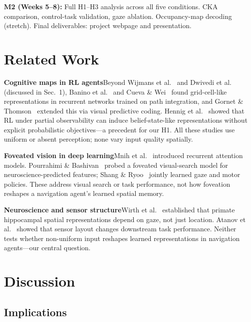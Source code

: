 \documentclass[10pt,conference,compsocconf]{IEEEtran}
\begin{document}
\noindent\textbf{M2 (Weeks 5--8):} Full H1--H3 analysis across all five conditions. CKA comparison, control-task validation, gaze ablation. Occupancy-map decoding (stretch). Final deliverables: project webpage and presentation.

\section{Related Work}

\textbf{Cognitive maps in RL agents}\quad Beyond Wijmans et al.~\cite{wijmans2023emergence} and Dwivedi et al.~\cite{dwivedi2022isee} (discussed in Sec.~1), Banino et al.~\cite{banino2018grid} and Cueva \& Wei~\cite{cueva2018grid} found grid-cell-like representations in recurrent networks trained on path integration, and Gornet \& Thomson~\cite{gornet2024cognitive} extended this via visual predictive coding. Hennig et al.~\cite{hennig2023belief} showed that RL under partial observability can induce belief-state-like representations without explicit probabilistic objectives---a precedent for our H1. All these studies use uniform or absent perception; none vary input quality spatially.

\textbf{Foveated vision in deep learning}\quad Mnih et al.~\cite{mnih2014attention} introduced recurrent attention models. Pourrahimi \& Bashivan~\cite{pourrahimi2025foveated} probed a foveated visual-search model for neuroscience-predicted features; Shang \& Ryoo~\cite{shang2023sugarl} jointly learned gaze and motor policies. These address visual search or task performance, not how foveation reshapes a navigation agent's learned spatial memory.

\textbf{Neuroscience and sensor structure}\quad Wirth et al.~\cite{wirth2017gaze} established that primate hippocampal spatial representations depend on gaze, not just location. Atanov et al.~\cite{atanov2024photoreceptor} showed that sensor layout changes downstream task performance. Neither tests whether non-uniform input reshapes learned representations in navigation agents---our central question.

\section{Discussion}

\subsection{Implications}
\end{document}
